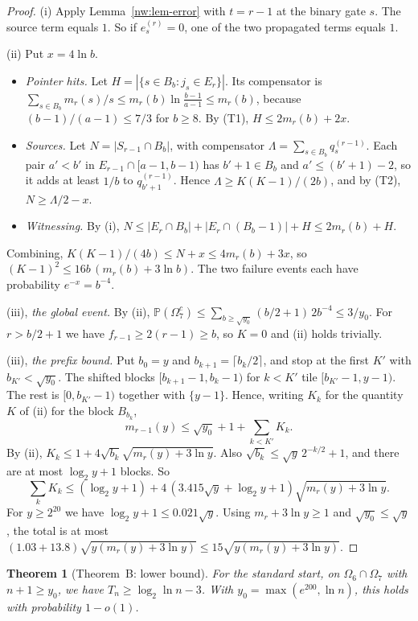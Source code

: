 \documentclass[11pt]{amsart}
\newtheorem{theorem}{Theorem}
\theoremstyle{definition}
\theoremstyle{remark}
\newcommand{\PP}{\mathbb{P}}
\begin{document}
\begin{proof}
(i) Apply Lemma~\ref{nw:lem-error} with $t=r-1$ at the binary gate $s$. The
source term equals $1$. So if $e^{(r)}_s=0$, one of the two propagated terms
equals $1$.

(ii) Put $x=4\ln b$.
\begin{itemize}[leftmargin=*]
\item \emph{Pointer hits.} Let $H=|\{s\in B_b:j_s\in E_r\}|$. Its compensator
  is $\sum_{s\in B_b}m_r(s)/s\le m_r(b)\ln\frac{b-1}{a-1}\le m_r(b)$, because
  $(b-1)/(a-1)\le7/3$ for $b\ge8$. By (T1), $H\le2m_r(b)+2x$.
\item \emph{Sources.} Let $N=|S_{r-1}\cap B_b|$, with compensator
  $\Lambda=\sum_{s\in B_b}q^{(r-1)}_s$. Each pair $a'<b'$ in
  $E_{r-1}\cap[a-1,b-1)$ has $b'+1\in B_b$ and $a'\le(b'+1)-2$, so it adds at
  least $1/b$ to $q^{(r-1)}_{b'+1}$. Hence $\Lambda\ge K(K-1)/(2b)$, and by
  (T2), $N\ge\Lambda/2-x$.
\item \emph{Witnessing.} By (i),
  $N\le|E_r\cap B_b|+|E_r\cap(B_b-1)|+H\le2m_r(b)+H$.
\end{itemize}
Combining, $K(K-1)/(4b)\le N+x\le4m_r(b)+3x$, so
$(K-1)^2\le16b\,(m_r(b)+3\ln b)$. The two failure events each have
probability $e^{-x}=b^{-4}$.

(iii), \emph{the global event.} By (ii),
$\PP(\Omega_7^c)\le\sum_{b\ge\sqrt{y_0}}(b/2+1)\,2b^{-4}\le3/y_0$. For
$r>b/2+1$ we have $f_{r-1}\ge2(r-1)\ge b$, so $K=0$ and (ii) holds trivially.

(iii), \emph{the prefix bound.} Put $b_0=y$ and $b_{k+1}=\lceil b_k/2\rceil$,
and stop at the first $K'$ with $b_{K'}<\sqrt{y_0}$. The shifted blocks
$[b_{k+1}-1,b_k-1)$ for $k<K'$ tile $[b_{K'}-1,y-1)$. The rest is
$[0,b_{K'}-1)$ together with $\{y-1\}$. Hence, writing $K_k$ for the quantity
$K$ of (ii) for the block $B_{b_k}$,
\[
  m_{r-1}(y)\le\sqrt{y_0}+1+\sum_{k<K'}K_k.
\]
By (ii), $K_k\le1+4\sqrt{b_k}\sqrt{m_r(y)+3\ln y}$. Also
$\sqrt{b_k}\le\sqrt y\,2^{-k/2}+1$, and there are at most $\log_2y+1$ blocks.
So
\[
  \sum_kK_k\le(\log_2y+1)+4\,(3.415\sqrt y+\log_2y+1)\sqrt{m_r(y)+3\ln y}.
\]
For $y\ge2^{20}$ we have $\log_2y+1\le0.021\sqrt y$. Using
$m_r+3\ln y\ge1$ and $\sqrt{y_0}\le\sqrt y$, the total is at most
$(1.03+13.8)\sqrt{y(m_r(y)+3\ln y)}\le15\sqrt{y(m_r(y)+3\ln y)}$.
\end{proof}

\begin{theorem}[Theorem~B: lower bound]\label{nw:thm-B}
For the standard start, on $\Omega_6\cap\Omega_7$ with $n+1\ge y_0$, we have
$T_n\ge\log_2\ln n-3$. With $y_0=\max(e^{200},\ln n)$, this holds with
probability $1-o(1)$.
\end{theorem}
\end{document}
